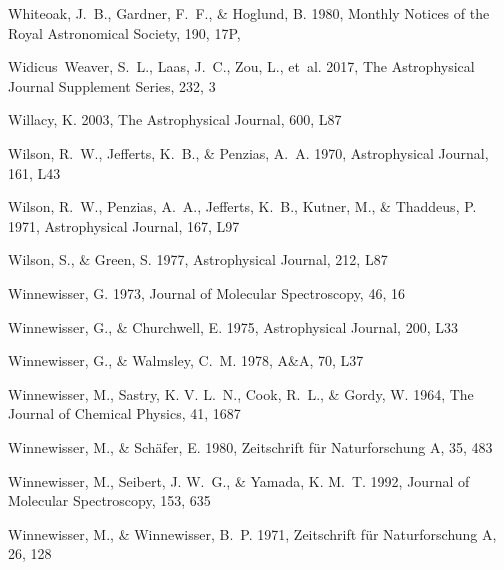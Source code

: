 \documentclass[twocolumn]{aastex631}
\begin{document}
\begin{thebibliography}{}
{Whiteoak}, J.~B., {Gardner}, F.~F., \& {Hoglund}, B. 1980, Monthly Notices of
  the Royal Astronomical Society, 190, 17P, 

Widicus~Weaver, S.~L., Laas, J.~C., Zou, L., {et~al.} 2017, The Astrophysical
  Journal Supplement Series, 232, 3

Willacy, K. 2003, The Astrophysical Journal, 600, L87

Wilson, R.~W., Jefferts, K.~B., \& Penzias, A.~A. 1970, Astrophysical Journal,
  161, L43

Wilson, R.~W., Penzias, A.~A., Jefferts, K.~B., Kutner, M., \& Thaddeus, P.
  1971, Astrophysical Journal, 167, L97

Wilson, S., \& Green, S. 1977, Astrophysical Journal, 212, L87

Winnewisser, G. 1973, Journal of Molecular Spectroscopy, 46, 16

Winnewisser, G., \& Churchwell, E. 1975, Astrophysical Journal, 200, L33

Winnewisser, G., \& Walmsley, C.~M. 1978, A{\&}A, 70, L37

Winnewisser, M., Sastry, K. V. L.~N., Cook, R.~L., \& Gordy, W. 1964, The
  Journal of Chemical Physics, 41, 1687

Winnewisser, M., \& Sch{\"a}fer, E. 1980, Zeitschrift f{\"u}r Naturforschung A,
  35, 483

Winnewisser, M., Seibert, J. W.~G., \& Yamada, K. M.~T. 1992, Journal of
  Molecular Spectroscopy, 153, 635

Winnewisser, M., \& Winnewisser, B.~P. 1971, Zeitschrift f{\"u}r Naturforschung
  A, 26, 128


\end{thebibliography}
\end{document}
